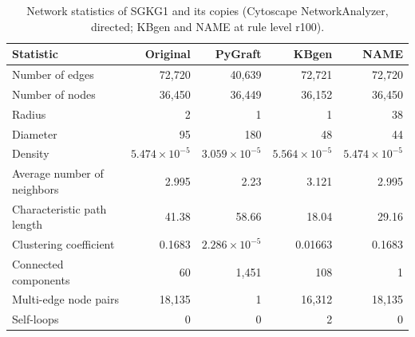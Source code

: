\begin{table}[t]
\centering
\caption{Network statistics of SGKG1 and its copies (Cytoscape NetworkAnalyzer, directed; KBgen and NAME at rule level r100).}
\label{tab:cytoscape_SGKG1}
\begin{tabular}{lrrrr}
\toprule
Statistic & Original & PyGraft & KBgen & NAME \\
\midrule
Number of edges & 72{,}720 & 40{,}639 & 72{,}721 & 72{,}720 \\
Number of nodes & 36{,}450 & 36{,}449 & 36{,}152 & 36{,}450 \\
Radius & 2 & 1 & 1 & 38 \\
Diameter & 95 & 180 & 48 & 44 \\
Density & $5.474\times10^{-5}$ & $3.059\times10^{-5}$ & $5.564\times10^{-5}$ & $5.474\times10^{-5}$ \\
Average number of neighbors & 2.995 & 2.23 & 3.121 & 2.995 \\
Characteristic path length & 41.38 & 58.66 & 18.04 & 29.16 \\
Clustering coefficient & 0.1683 & $2.286\times10^{-5}$ & 0.01663 & 0.1683 \\
Connected components & 60 & 1{,}451 & 108 & 1 \\
Multi-edge node pairs & 18{,}135 & 1 & 16{,}312 & 18{,}135 \\
Self-loops & 0 & 0 & 2 & 0 \\
\bottomrule
\end{tabular}
\end{table}
